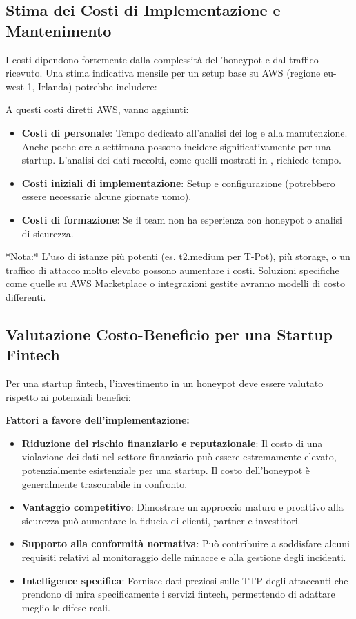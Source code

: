 \subsection{Stima dei Costi di Implementazione e Mantenimento}
\label{subsec:stima_costi}

I costi dipendono fortemente dalla complessità dell'honeypot e dal traffico ricevuto. Una stima indicativa mensile per un setup base su AWS (regione eu-west-1, Irlanda) potrebbe includere:


    

A questi costi diretti AWS, vanno aggiunti:

\begin{itemize}
    \item \textbf{Costi di personale}: Tempo dedicato all'analisi dei log e alla manutenzione. Anche poche ore a settimana possono incidere significativamente per una startup. L'analisi dei dati raccolti, come quelli mostrati in \cite{peiris_2024}, richiede tempo.
    \item \textbf{Costi iniziali di implementazione}: Setup e configurazione (potrebbero essere necessarie alcune giornate uomo).
    \item \textbf{Costi di formazione}: Se il team non ha esperienza con honeypot o analisi di sicurezza.
\end{itemize}

*Nota:* L'uso di istanze più potenti (es. t2.medium per T-Pot), più storage, o un traffico di attacco molto elevato possono aumentare i costi. Soluzioni specifiche come quelle su AWS Marketplace \cite{aws_marketplace} o integrazioni gestite \cite{rapid7, salient_2025} avranno modelli di costo differenti.

\subsection{Valutazione Costo-Beneficio per una Startup Fintech}
\label{subsec:costo_beneficio}

Per una startup fintech, l'investimento in un honeypot deve essere valutato rispetto ai potenziali benefici:

\textbf{Fattori a favore dell'implementazione:}
\begin{itemize}
    \item \textbf{Riduzione del rischio finanziario e reputazionale}: Il costo di una violazione dei dati nel settore finanziario può essere estremamente elevato, potenzialmente esistenziale per una startup. Il costo dell'honeypot è generalmente trascurabile in confronto.
    \item \textbf{Vantaggio competitivo}: Dimostrare un approccio maturo e proattivo alla sicurezza può aumentare la fiducia di clienti, partner e investitori.
    \item \textbf{Supporto alla conformità normativa}: Può contribuire a soddisfare alcuni requisiti relativi al monitoraggio delle minacce e alla gestione degli incidenti.
    \item \textbf{Intelligence specifica}: Fornisce dati preziosi sulle TTP degli attaccanti che prendono di mira specificamente i servizi fintech, permettendo di adattare meglio le difese reali.
\end{itemize}


